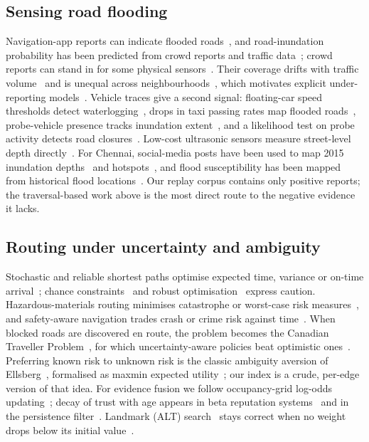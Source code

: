 \documentclass[conference]{IEEEtran}
\begin{document}
\subsection{Sensing road flooding}
Navigation-app reports can indicate flooded roads~\cite{praharaj2021waze,safaei2023waze,lowrie2022waze}, and road-inundation probability has been predicted from crowd reports and traffic data~\cite{yuan2023predicting}; crowd reports can stand in for some physical sensors~\cite{esparza2024crowd}. Their coverage drifts with traffic volume~\cite{liu2023wazecoverage} and is unequal across neighbourhoods~\cite{esparza2023imbalance}, which motivates explicit under-reporting models~\cite{agostini2024underreport}. Vehicle traces give a second signal: floating-car speed thresholds detect waterlogging~\cite{hu2018fcd}, drops in taxi passing rates map flooded roads~\cite{kong2022taxi}, probe-vehicle presence tracks inundation extent~\cite{hiramoto2025probe}, and a likelihood test on probe activity detects road closures~\cite{pietrobon2019closure}. Low-cost ultrasonic sensors measure street-level depth directly~\cite{mydlarz2024floodnet}. For Chennai, social-media posts have been used to map 2015 inundation depths~\cite{karmegam2021chennai} and hotspots~\cite{sattaru2021utilizing}, and flood susceptibility has been mapped from historical flood locations~\cite{natarajan2021flood}. Our replay corpus contains only positive reports; the traversal-based work above is the most direct route to the negative evidence it lacks.

\subsection{Routing under uncertainty and ambiguity}
Stochastic and reliable shortest paths optimise expected time, variance or on-time arrival~\cite{frank1969probabilistic,sivakumar1994variance,fu1998expected,millerhooks2000least,nie2009ontime,xing2011reliable,samaranayake2012reliable}; chance constraints~\cite{charnes1959chance} and robust optimisation~\cite{bertsimas2003robust} express caution. Hazardous-materials routing minimises catastrophe or worst-case risk measures~\cite{erkut2000catastrophe,toumazis2016wcvar}, and safety-aware navigation trades crash or crime risk against time~\cite{galbrun2016safe,krumm2017riskaware,rohmann2026bayesian}. When blocked roads are discovered en route, the problem becomes the Canadian Traveller Problem~\cite{papadimitriou1991ctp}, for which uncertainty-aware policies beat optimistic ones~\cite{eyerich2010ctp}. Preferring known risk to unknown risk is the classic ambiguity aversion of Ellsberg~\cite{ellsberg1961risk}, formalised as maxmin expected utility~\cite{gilboa1989maxmin}; our index is a crude, per-edge version of that idea. For evidence fusion we follow occupancy-grid log-odds updating~\cite{elfes1989occupancy}; decay of trust with age appears in beta reputation systems~\cite{josang2002beta} and in the persistence filter~\cite{rosen2016persistence}. Landmark (ALT) search~\cite{goldberg2005alt} stays correct when no weight drops below its initial value~\cite{delling2007landmark}.
\end{document}
